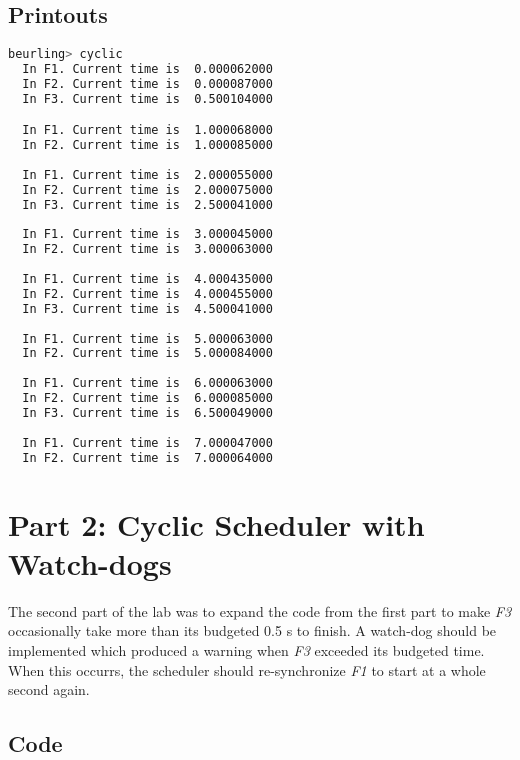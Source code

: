 \documentclass[a4paper,10pt]{article}
\begin{document}
\subsection{Printouts}

\begin{lstlisting}[language=Bash]
  beurling> cyclic
  In F1. Current time is  0.000062000
  In F2. Current time is  0.000087000
  In F3. Current time is  0.500104000

  In F1. Current time is  1.000068000
  In F2. Current time is  1.000085000
  
  In F1. Current time is  2.000055000
  In F2. Current time is  2.000075000
  In F3. Current time is  2.500041000
  
  In F1. Current time is  3.000045000
  In F2. Current time is  3.000063000
  
  In F1. Current time is  4.000435000
  In F2. Current time is  4.000455000
  In F3. Current time is  4.500041000
  
  In F1. Current time is  5.000063000
  In F2. Current time is  5.000084000
  
  In F1. Current time is  6.000063000
  In F2. Current time is  6.000085000
  In F3. Current time is  6.500049000
  
  In F1. Current time is  7.000047000
  In F2. Current time is  7.000064000
\end{lstlisting}

\section{Part 2: Cyclic Scheduler with Watch-dogs}

The second part of the lab was to expand the code from the first part to make \emph{F3} occasionally take more than its budgeted 0.5 s to finish. A watch-dog should be implemented which produced a warning when \emph{F3} exceeded its budgeted time. When this occurrs, the scheduler should re-synchronize \emph{F1} to start at a whole second again.

\subsection{Code}
\end{document}

